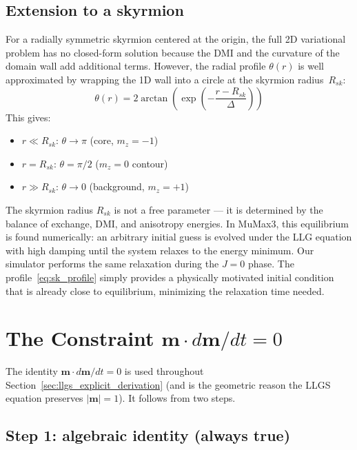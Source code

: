 \documentclass[11pt,a4paper]{article}
\newcommand{\mb}[1]{\mathbf{#1}}
\begin{document}
\subsection*{Extension to a skyrmion}

For a radially symmetric skyrmion centered at the origin, the full
2D variational problem has no closed-form solution because the DMI
and the curvature of the domain wall add additional terms.  However,
the radial profile $\theta(r)$ is well approximated by wrapping the
1D wall into a circle at the skyrmion radius~$R_{sk}$:
%
\begin{equation}\label{eq:sk_profile}
\theta(r) = 2\arctan\!\left(
    \exp\!\left(-\frac{r - R_{sk}}{\Delta}\right)
\right)
\end{equation}
%
This gives:
%
\begin{itemize}[nosep]
\item $r \ll R_{sk}$: $\theta \to \pi$
    \quad (core, $m_z = -1$)
\item $r = R_{sk}$: $\theta = \pi/2$
    \quad ($m_z = 0$ contour)
\item $r \gg R_{sk}$: $\theta \to 0$
    \quad (background, $m_z = +1$)
\end{itemize}

The skyrmion radius $R_{sk}$ is not a free parameter --- it is
determined by the balance of exchange, DMI, and anisotropy energies.
In MuMax3, this equilibrium is found numerically: an arbitrary
initial guess is evolved under the LLG equation with high damping
until the system relaxes to the energy minimum.  Our simulator
performs the same relaxation during the $J = 0$ phase.  The
profile~\eqref{eq:sk_profile} simply provides a physically
motivated initial condition that is already close to equilibrium,
minimizing the relaxation time needed.

\section{The Constraint $\mb{m}\cdot d\mb{m}/dt = 0$}
\label{app:m_perp_mdot}

The identity $\mb{m}\cdot d\mb{m}/dt = 0$ is used throughout
Section~\ref{sec:llgs_explicit_derivation} (and is the geometric
reason the LLGS equation preserves $|\mb{m}|=1$). It follows from two
steps.

\subsection*{Step 1: algebraic identity (always true)}
\end{document}
